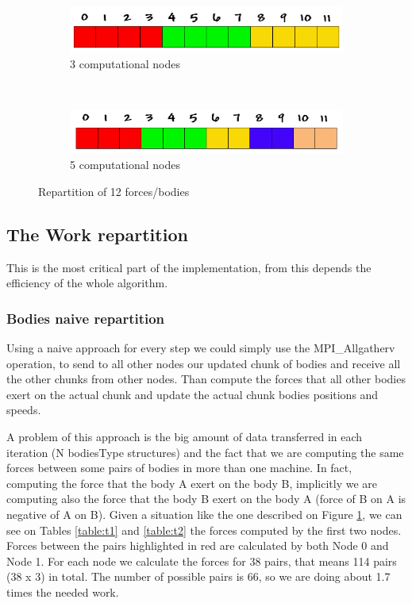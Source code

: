 \documentclass[a4paper]{article}
\begin{document}
\begin{figure}[!ht]
    \centering
    \begin{subfigure}[b]{0.5\textwidth}
        \centering
        \includegraphics[width=1\linewidth]{array_procs_3}
        \caption{3 computational nodes}
        \label{fig:repa1}
    \end{subfigure}%
    ~ 
    \begin{subfigure}[b]{0.5\textwidth}
        \centering
        \includegraphics[width=1\linewidth]{array_procs_5}
        \caption{5 computational nodes}
        \label{fig:repa2}
    \end{subfigure}
    \caption{Repartition of 12 forces/bodies}
    \label{fig:repa}
    	
\end{figure}
\FloatBarrier

\subsection{The Work repartition}
\label{sec:work_rep}

This is the most critical part of the implementation, from this depends the efficiency of the whole algorithm. 

\subsubsection{Bodies naive repartition}
\label{sec:naive_rep}
Using a naive approach for every step we could simply use the MPI\_Allgatherv operation, to send to all other nodes our updated chunk of bodies and receive all the other chunks from other nodes. Than compute the forces that all other bodies exert on the actual chunk and update the actual chunk bodies positions and speeds. 

A problem of this approach is the big amount of data transferred in each iteration (N bodiesType structures) and the fact that we are computing the same forces between some pairs of bodies in more than one machine. In fact, computing the force that the body A exert on the body B, implicitly we are computing also the force that the body B exert on the body A (force of B on A is negative of A on B). Given a situation like the one described on Figure \ref{fig:repa1}, we can see on Tables \ref{table:t1} and \ref{table:t2} the forces computed by the first two nodes. Forces between the pairs highlighted in red are calculated by both Node 0 and Node 1. For each node we calculate the forces for 38 pairs, that means 114 pairs (38 x 3) in total. The number of possible pairs is 66, so we are doing about 1.7 times the needed work. \\
\end{document}
